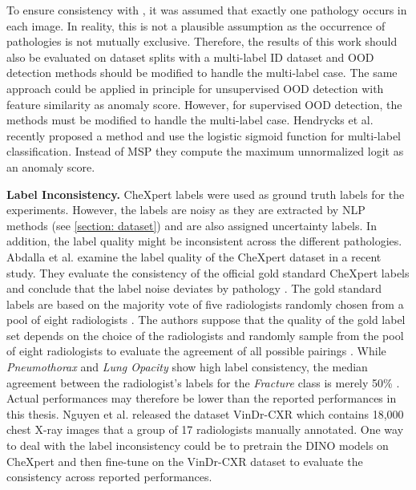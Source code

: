 To ensure consistency with \citep{Berger2021}, it was assumed that exactly one pathology occurs in each image.
In reality, this is not a plausible assumption as the occurrence of pathologies is not mutually exclusive.
Therefore, the results of this work should also be evaluated on dataset splits with a multi-label ID dataset and OOD detection methods should be modified to handle the multi-label case.
The same approach could be applied in principle for unsupervised OOD detection with feature similarity as anomaly score.
However, for supervised OOD detection, the methods must be modified to handle the multi-label case.
Hendrycks et al. \citep{Hendrycks2022} recently proposed a method and use the logistic sigmoid function for multi-label classification.
Instead of MSP they compute the maximum unnormalized logit as an anomaly score.
\par
\textbf{Label Inconsistency.}
CheXpert labels were used as ground truth labels for the experiments.
However, the labels are noisy as they are extracted by NLP methods (see \ref{section: dataset}) and are also assigned uncertainty labels.
In addition, the label quality might be inconsistent across the different pathologies.
Abdalla et al. \citep{Abdalla2023} examine the label quality of the CheXpert dataset in a recent study.
They evaluate the consistency of the official gold standard CheXpert labels and conclude that the label noise deviates by pathology \citep{Abdalla2023}.
The gold standard labels are based on the majority vote of five radiologists randomly chosen from a pool of eight radiologists \citep{Irvin2019}.
The authors suppose that the quality of the gold label set depends on the choice of the radiologists and randomly sample from the pool of eight radiologists to evaluate the agreement of all possible pairings \citep{Abdalla2023}. 
While \textit{Pneumothorax} and \textit{Lung Opacity} show high label consistency, the median agreement between the radiologist's labels for the \textit{Fracture} class is merely 50\% \citep{Abdalla2023}.
Actual performances may therefore be lower than the reported performances in this thesis.
Nguyen et al. \citep{Nguyen2022} released the dataset VinDr-CXR which contains 18,000 chest X-ray images that a group of 17 radiologists manually annotated.
One way to deal with the label inconsistency could be to pretrain the DINO models on CheXpert and then fine-tune on the VinDr-CXR dataset to evaluate the consistency across reported performances.
